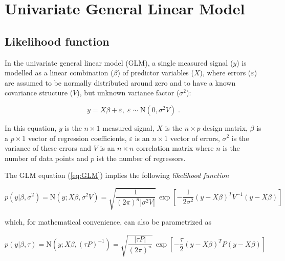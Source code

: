 

\setcounter{equation}{0}
\section{Univariate General Linear Model} \label{sec:GLM}

\subsection{Likelihood function} \label{sec:GLM-LF}

In the univariate general linear model (GLM), a single measured signal ($y$) is modelled as a linear combination ($\beta$) of predictor variables ($X$), where errors ($\varepsilon$) are assumed to be normally distributed around zero and to have a known covariance structure ($V$), but unknown variance factor ($\sigma^2$):

\begin{equation} \label{eq:GLM}
y = X \beta + \varepsilon, \; \varepsilon \sim \mathrm{N}(0, \sigma^2 V) \; .
\end{equation}

In this equation, $y$ is the $n \times 1$ measured signal, $X$ is the $n \times p$ design matrix, $\beta$ is a $p \times 1$ vector of regression coefficients, $\varepsilon$ is an $n \times 1$ vector of errors, $\sigma^2$ is the variance of these errors and $V$ is an $n \times n$ correlation matrix where $n$ is the number of data points and $p$ ist the number of regressors.

The GLM equation (\ref{eq:GLM}) implies the following \textit{likelihood function}

\begin{equation} \label{eq:GLM-LF-class}
p(y|\beta,\sigma^2) = \mathrm{N}(y; X \beta, \sigma^2 V) = \sqrt{\frac{1}{(2 \pi)^n |\sigma^2 V|}} \, \exp\left[ -\frac{1}{2 \sigma^2} (y-X\beta)^T V^{-1} (y-X\beta) \right]
\end{equation}

which, for mathematical convenience, can also be parametrized as

\begin{equation} \label{eq:GLM-LF-Bayes}
p(y|\beta,\tau) = \mathrm{N}(y; X \beta, (\tau P)^{-1}) = \sqrt{\frac{|\tau P|}{(2 \pi)^n}} \, \exp\left[ -\frac{\tau}{2} (y-X\beta)^T P (y-X\beta) \right]
\end{equation}


